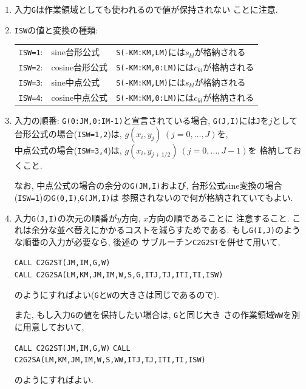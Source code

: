 \documentclass[a4j,fleqn]{jarticle}
\begin{document}
\begin{enumerate}
\begin{enumerate}
\item 入力{\tt G}は作業領域としても使われるので値が保持されない
      ことに注意.

\item {\tt ISW}の値と変換の種類:

 \begin{tabular}{lll}
    {\tt ISW=1}: & sine台形公式   
        & {\tt S(-KM:KM,LM)}には$s_{kl}$が格納される\\
    {\tt ISW=2}: & cosine台形公式 
        & {\tt S(-KM:KM,0:LM)}には$c_{kl}$が格納される\\
    {\tt ISW=3}: & sine中点公式   
        & {\tt S(-KM:KM,LM)}には$s_{kl}$が格納される\\
    {\tt ISW=4}: & cosine中点公式 
        & {\tt S(-KM:KM,0:LM)}には$c_{kl}$が格納される
 \end{tabular}

\item 入力の順番: {\tt G(0:JM,0:IM-1)}と宣言されている場合, 
{\tt G(J,I)}には{\tt J}を$j$として\\
    台形公式の場合({\tt ISW=1,2})は, $g(x_i,y_j)\ (j=0,\ldots,J)$を,\\
    中点公式の場合({\tt ISW=3,4})は, $g(x_i,y_{j+1/2})\ (j=0,\ldots,J-1)$を
    格納しておくこと.

    なお, 中点公式の場合の余分の{\tt G(JM,I)}および,
    台形公式sine変換の場合({\tt ISW=1})の{\tt G(0,I)},{\tt G(JM,I)}は
     参照されないので何が格納されていてもよい.

\item 入力{\tt G(J,I)}の次元の順番が$y$方向, $x$方向の順であることに
      注意すること. これは余分な並べ替えにかかるコストを減らすためである.
      もし{\tt G(I,J)}のような順番の入力が必要なら, 後述の
      サブルーチン{\tt C2G2ST}を併せて用いて,

        {\tt CALL C2G2ST(JM,IM,G,W)}\\
        {\tt CALL C2G2SA(LM,KM,JM,IM,W,S,G,ITJ,TJ,ITI,TI,ISW)}
	
      のようにすればよい({\tt G}と{\tt W}の大きさは同じであるので).
      
      また, もし入力{\tt G}の値を保持したい場合は, {\tt G}と同じ大き
      さの作業領域{\tt WW}を別に用意しておいて,

        {\tt CALL C2G2ST(JM,IM,G,W)}
        {\tt CALL C2G2SA(LM,KM,JM,IM,W,S,WW,ITJ,TJ,ITI,TI,ISW)}
	
      のようにすればよい.
	
\end{enumerate}

\end{enumerate}
\end{document}
